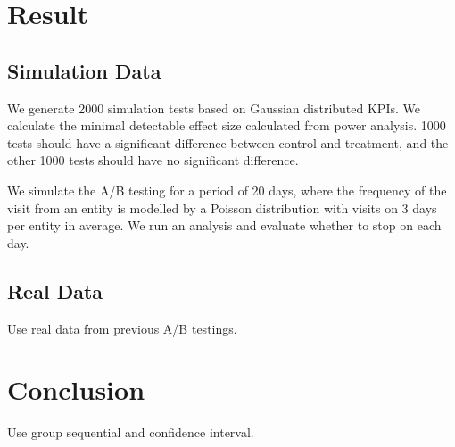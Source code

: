 \documentclass[paper=a4, fontsize=11pt]{scrartcl} %
\numberwithin{equation}{section} %
\numberwithin{figure}{section} %
\numberwithin{table}{section} %
\begin{document}
\section{Result}

\subsection{Simulation Data}
We generate 2000 simulation tests based on Gaussian distributed KPIs. We calculate the minimal detectable effect size calculated from power analysis. 1000 tests should have a significant difference between control and treatment, and the other 1000 tests should have no significant difference. 

We simulate the A/B testing for a period of 20 days, where the frequency of the visit from an entity is modelled by a Poisson distribution with visits on 3 days per entity in average. We run an analysis and evaluate whether to stop on each day.

\subsection{Real Data}
Use real data from previous A/B testings.

\section{Conclusion}
Use group sequential and confidence interval.

\end{document}
